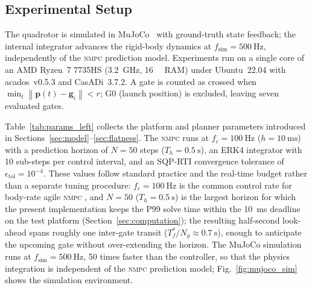 \documentclass{ieeeaccess}
\newcommand{\norm}[1]{\left\| #1 \right\|}
\newcommand{\vect}[1]{\bm{#1}}
\newcommand{\nmpc}{\textsc{nmpc}}
\newcommand{\mujoco}{MuJoCo}
\begin{document}
\subsection{Experimental Setup}
\label{sec:setup}

The quadrotor is simulated in \mujoco{}~\cite{todorov2012mujoco} with
ground-truth state feedback; the internal integrator advances the
rigid-body dynamics at $f_\text{sim}=\SI{500}{\hertz}$, independently
of the \nmpc{} prediction model.
Experiments run on a single core of an AMD Ryzen~7 7735HS
(\SI{3.2}{\giga\hertz}, \SI{16}{\giga\byte} RAM) under Ubuntu~22.04
with acados~v0.5.3 and CasADi~3.7.2.
A gate is counted as crossed when
$\min_t\norm{\vect{p}(t)-\vect{g}_i}<r$; G0 (launch position) is
excluded, leaving seven evaluated gates.

Table~\ref{tab:params_left} collects the platform and planner
parameters introduced in Sections~\ref{sec:model}--\ref{sec:flatness}.
The \nmpc{} runs at $f_c=\SI{100}{\hertz}$ ($h=\SI{10}{\milli\second}$)
with a prediction horizon of $N=50$ steps ($T_h=\SI{0.5}{\s}$), an
ERK4 integrator with 10 sub-steps per control interval, and an
SQP-RTI convergence tolerance of $\epsilon_\text{tol}=10^{-4}$.
These values follow standard practice and the real-time budget rather
than a separate tuning procedure: $f_c=\SI{100}{\hertz}$ is the common
control rate for body-rate agile \nmpc{}
\cite{hanover2021performance,verschueren2022acados}, and $N=50$
($T_h=\SI{0.5}{\s}$) is the largest horizon for which the present
implementation keeps the P99 solve time within the
\SI{10}{\milli\second} deadline on the test platform
(Section~\ref{sec:computation}); the resulting half-second look-ahead
spans roughly one inter-gate transit
($T_f^*/N_g\!\approx\!\SI{0.7}{\s}$), enough to anticipate the upcoming
gate without over-extending the horizon.
The \mujoco{} simulation runs at $f_\text{sim}=\SI{500}{\hertz}$,
50 times faster than the controller, so that the physics integration
is independent of the \nmpc{} prediction model;
Fig.~\ref{fig:mujoco_sim} shows the simulation environment.
\end{document}
